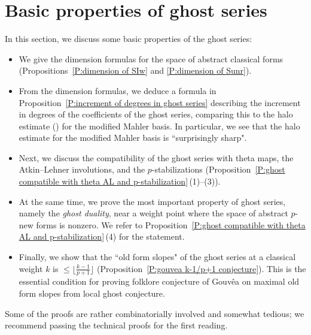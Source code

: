 \documentclass[12pt]{amsart}
\theoremstyle{definition}
\numberwithin{equation}{subsection}
\def\rmS{\mathrm{S}}
\newcommand{\Iw}{\mathrm{Iw}}
\begin{document}





\section{Basic properties of ghost series}
\label{Sec:properties of ghost series}

In this section, we discuss some basic properties of the ghost series:
\begin{itemize}
\item We give the dimension formulas for the space of abstract classical forms (Propositions~\ref{P:dimension of SIw} and \ref{P:dimension of Sunr}).
\item 
From the dimension formulas, we deduce a formula in Proposition~\ref{P:increment of degrees in ghost series} describing the increment in degrees of the coefficients of the ghost series, comparing this to the halo estimate (\cite[Theorem 3.16]{liu-wan-xiao}) for the modified Mahler basis. In particular, we see that the halo estimate for the modified Mahler basis is ``surprisingly sharp".
\item 
Next, we discuss the compatibility of the ghost series with theta maps,  the Atkin--Lehner involutions, and the $p$-stabilizations (Proposition~\ref{P:ghost compatible with theta AL and p-stabilization}\,(1)--(3)).  
 \item
At the same time, we prove the most important property of ghost series, namely the \emph{ghost duality}, near a weight point where the space of abstract $p$-new forms  is nonzero. We refer to Proposition~\ref{P:ghost compatible with theta AL and p-stabilization}\,(4) for the statement.

\item Finally, we show that the ``old form slopes" of the ghost series at a classical weight $k$ is $\leq \lfloor \frac{k-1}{p+1}\rfloor$ (Proposition~\ref{P:gouvea k-1/p+1 conjecture}). This is the essential condition for proving folklore conjecture of Gouv\^ea on maximal old form slopes from local ghost conjecture.
\end{itemize}
Some of the proofs are rather combinatorially involved and somewhat tedious; we recommend passing the technical proofs for the first reading.
\end{document}
